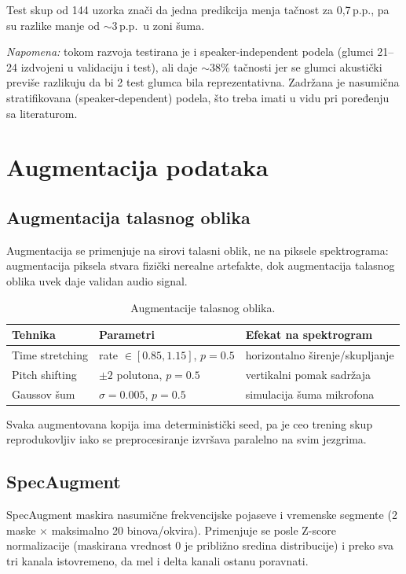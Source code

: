 \documentclass[12pt,a4paper]{article}
\begin{document}
Test skup od 144 uzorka znači da jedna predikcija menja tačnost za
0,7\,p.p., pa su razlike manje od $\sim$3\,p.p.\ u zoni šuma.

\emph{Napomena:} tokom razvoja testirana je i speaker-independent podela
(glumci 21--24 izdvojeni u validaciju i test), ali daje $\sim$38\% tačnosti
jer se glumci akustički previše razlikuju da bi 2 test glumca bila
reprezentativna. Zadržana je nasumična stratifikovana (speaker-dependent)
podela, što treba imati u vidu pri poređenju sa literaturom.

\section{Augmentacija podataka}

\subsection{Augmentacija talasnog oblika}

Augmentacija se primenjuje na sirovi talasni oblik, ne na piksele
spektrograma: augmentacija piksela stvara fizički nerealne artefakte, dok
augmentacija talasnog oblika uvek daje validan audio signal.

\begin{table}[H]
\centering
\begin{tabular}{lll}
\toprule
Tehnika & Parametri & Efekat na spektrogram \\
\midrule
Time stretching & rate $\in [0.85, 1.15]$, $p{=}0.5$ & horizontalno širenje/skupljanje \\
Pitch shifting  & $\pm 2$ polutona, $p{=}0.5$        & vertikalni pomak sadržaja \\
Gaussov šum     & $\sigma{=}0.005$, $p{=}0.5$        & simulacija šuma mikrofona \\
\bottomrule
\end{tabular}
\caption{Augmentacije talasnog oblika.}
\end{table}

Svaka augmentovana kopija ima deterministički seed, pa je ceo trening skup
reprodukovljiv iako se preprocesiranje izvršava paralelno na svim jezgrima.

\subsection{SpecAugment}

SpecAugment maskira nasumične frekvencijske pojaseve i vremenske segmente
(2 maske $\times$ maksimalno 20 binova/okvira). Primenjuje se posle Z-score
normalizacije (maskirana vrednost 0 je približno sredina distribucije) i
preko sva tri kanala istovremeno, da mel i delta kanali ostanu poravnati.
\end{document}
